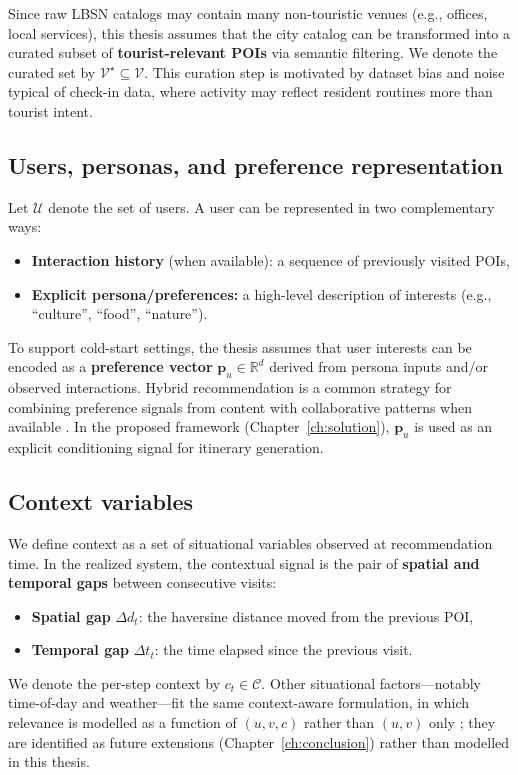 Since raw LBSN catalogs may contain many non-touristic venues (e.g., offices, local services), this thesis assumes that the city catalog can be transformed into a curated subset of \textbf{tourist-relevant POIs} via semantic filtering. We denote the curated set by $\mathcal{V}^{\star} \subseteq \mathcal{V}$. This curation step is motivated by dataset bias and noise typical of check-in data, where activity may reflect resident routines more than tourist intent.

\subsection{Users, personas, and preference representation}
Let $\mathcal{U}$ denote the set of users. A user can be represented in two complementary ways:
\begin{itemize}[leftmargin=*]
    \item \textbf{Interaction history} (when available): a sequence of previously visited POIs,
    \item \textbf{Explicit persona/preferences:} a high-level description of interests (e.g., ``culture'', ``food'', ``nature'').
\end{itemize}

To support cold-start settings, the thesis assumes that user interests can be encoded as a \textbf{preference vector} $\mathbf{p}_u \in \mathbb{R}^{d}$ derived from persona inputs and/or observed interactions. Hybrid recommendation is a common strategy for combining preference signals from content with collaborative patterns when available \citep{burke2002hybrid}. In the proposed framework (Chapter~\ref{ch:solution}), $\mathbf{p}_u$ is used as an explicit conditioning signal for itinerary generation.

\subsection{Context variables}
We define context as a set of situational variables observed at recommendation time. In the realized system, the contextual signal is the pair of \textbf{spatial and temporal gaps} between consecutive visits:
\begin{itemize}[leftmargin=*]
    \item \textbf{Spatial gap} $\Delta d_t$: the haversine distance moved from the previous POI,
    \item \textbf{Temporal gap} $\Delta t_t$: the time elapsed since the previous visit.
\end{itemize}
We denote the per-step context by $c_t \in \mathcal{C}$. Other situational factors---notably time-of-day and weather---fit the same context-aware formulation, in which relevance is modelled as a function of $(u,v,c)$ rather than $(u,v)$ only \citep{adomavicius2005tois, adomavicius2022cars, villegas2018cars}; they are identified as future extensions (Chapter~\ref{ch:conclusion}) rather than modelled in this thesis.

